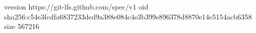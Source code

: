 version https://git-lfs.github.com/spec/v1
oid sha256:c54e3fcdfa6837233ded9a388e084c4e3b399e896378d8870e14e5154acb6358
size 567216
